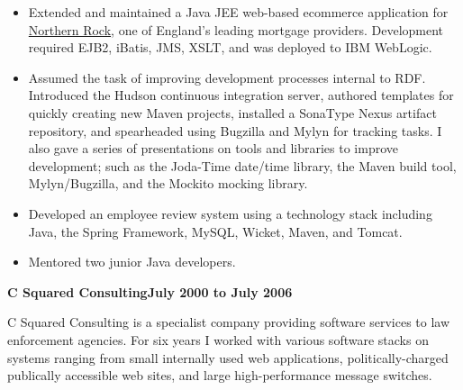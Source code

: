 \documentclass[a4paper,12pt]{article}
\newcommand{\jobheld}[2]{\textbf{#1\hfill #2}\nopagebreak}
\newcommand{\clientwork}[2]{\emph{#1\hfill #2}\nopagebreak}
\begin{document}

\begin{itemize}

\item Extended and maintained a Java JEE web-based ecommerce application for \href{http://www.northernrock.co.uk}{Northern Rock}, one of England's leading mortgage providers.  Development required EJB2, iBatis, JMS, XSLT, and was deployed to IBM WebLogic.

\item Assumed the task of improving development processes internal to RDF. Introduced the Hudson continuous integration server, authored templates for quickly creating new Maven projects, installed a SonaType Nexus artifact repository, and spearheaded using Bugzilla and Mylyn for tracking tasks.  I also gave a series of presentations on tools and libraries to improve development; such as the Joda-Time date/time library, the Maven build tool, Mylyn/Bugzilla,  and the Mockito mocking library. 

\end{itemize}


\begin{itemize}
\item Developed an employee review system using a technology stack including Java, the Spring Framework, MySQL, Wicket, Maven, and Tomcat.

\item Mentored two junior Java developers.

\end{itemize}

\jobheld{C Squared Consulting}{July 2000 to July 2006}

C Squared Consulting is a specialist company providing software services to law enforcement agencies.  For six years I worked with various software stacks on systems ranging from small internally used web applications, politically-charged publically accessible web sites, and large high-performance message switches.
\end{document}
